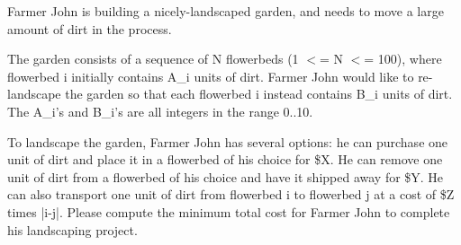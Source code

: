 Farmer John is building a nicely-landscaped garden, and needs to move a large amount of dirt in the process.

The garden consists of a sequence of N flowerbeds (1 $<$= N $<$= 100), where flowerbed i initially contains A\_i units of dirt.  Farmer John would like to re-landscape the garden so that each flowerbed i instead contains B\_i units of dirt.  The A\_i's and B\_i's are all integers in the range 0..10.

To landscape the garden, Farmer John has several options: he can purchase one unit of dirt and place it in a flowerbed of his choice for \$X.  He can remove one unit of dirt from a flowerbed of his choice and have it shipped away for \$Y.  He can also transport one unit of dirt from flowerbed i to flowerbed j at a cost of \$Z times |i-j|.  Please compute the minimum total cost for Farmer John to complete his landscaping project.
